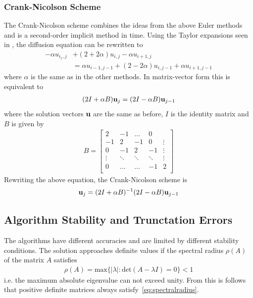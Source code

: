 \documentclass[aps,reprint]{revtex4-1}
\begin{document}
\subsubsection{Crank-Nicolson Scheme}
The Crank-Nicolson scheme combines the ideas from the above Euler methods and is
a second-order implicit method in time. Using the Taylor expansions seen in
\cite{mortenjensen}, the diffusion equation can be rewritten to
\begin{align*}
  -\alpha u_{i_1, j} &+ (2 + 2\alpha) u_{i,j} - \alpha u_{i+1,j}\\
   &= \alpha u_{i-1,j-1} + (2 - 2\alpha) u_{i, j-1} + \alpha u_{i+1,j-1}
\end{align*}
where $\alpha$ is the same as in the other methods. In matrix-vector form this
is equivalent to
\begin{align*}
  (2 I + \alpha B) \vb{u}_j = (2 I - \alpha B) \vb{u}_{j-1}
\end{align*}
where the solution vectors $\vb{u}$ are the same as before, $I$ is the identity
matrix and $B$ is given by
\begin{align*}
  B = \begin{bmatrix}
        2  & -1 & \hdots  & 0      \\
        -1 & 2  & -1 & 0       & \vdots \\
        0  & -1 & 2  & -1  & \vdots \\
        \vdots       & \ddots      & \ddots       & \ddots  & \vdots \\
        0  & \hdots  & \hdots       & -1  & 2 \\
      \end{bmatrix}
\end{align*}
Rewriting the above equation, the Crank-Nicolson scheme is
\begin{align*}
  \vb{u}_j = (2 I + \alpha B)^{-1} (2 I - \alpha B) \vb{u}_{j-1}
\end{align*}
\subsection{Algorithm Stability and Trunctation Errors}
The algorithms have different accuracies and are limited by different stability
conditions. The solution approaches definite values if the spectral radius $\rho(A)$ of
the matrix $A$ satisfies
\begin{align} \label{eq:spectralradius}
  \rho(A) = \text{max}\{ |\lambda| : \text{det}(A - \lambda I) = 0 \} < 1
\end{align}
i.e. the maximum absolute eigenvalue can not exceed unity. From this is follows
that positive definite matrices always satisfy~\ref{eq:spectralradius}.
\end{document}
